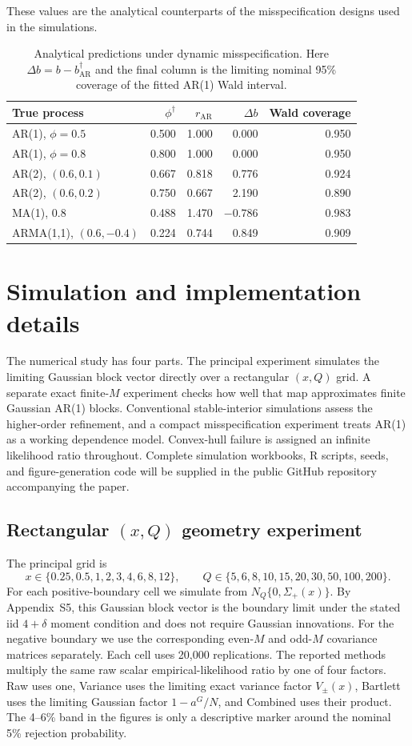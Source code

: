 \documentclass[12pt]{article}
\theoremstyle{remark}
\begin{document}
These values are the analytical counterparts of the misspecification designs used in the simulations.
\begin{table}[htbp]
\centering
\small
\caption{Analytical predictions under dynamic misspecification. Here $\Delta b=b-b_{\mathrm{AR}}^\dagger$ and the final column is the limiting nominal 95\% coverage of the fitted AR(1) Wald interval.}
\label{tab:supp-misspec-theory}
\begin{tabular}{lrrrr}
\toprule
True process & $\phi^\dagger$ & $r_{\mathrm{AR}}$ & $\Delta b$ & Wald coverage \\
\midrule
AR(1), $\phi=0.5$ & 0.500 & 1.000 & 0.000 & 0.950 \\
AR(1), $\phi=0.8$ & 0.800 & 1.000 & 0.000 & 0.950 \\
AR(2), $(0.6,0.1)$ & 0.667 & 0.818 & 0.776 & 0.924 \\
AR(2), $(0.6,0.2)$ & 0.750 & 0.667 & 2.190 & 0.890 \\
MA(1), $0.8$ & 0.488 & 1.470 & $-0.786$ & 0.983 \\
ARMA(1,1), $(0.6,-0.4)$ & 0.224 & 0.744 & 0.849 & 0.909 \\
\bottomrule
\end{tabular}
\end{table}

\section{Simulation and implementation details}
\label{supp:simulation}
The numerical study has four parts. The principal experiment simulates the limiting Gaussian block vector directly over a rectangular $(x,Q)$ grid. A separate exact finite-$M$ experiment checks how well that map approximates finite Gaussian AR(1) blocks. Conventional stable-interior simulations assess the higher-order refinement, and a compact misspecification experiment treats AR(1) as a working dependence model. Convex-hull failure is assigned an infinite likelihood ratio throughout. Complete simulation workbooks, R scripts, seeds, and figure-generation code will be supplied in the public GitHub repository accompanying the paper.

\subsection{Rectangular $(x,Q)$ geometry experiment}
The principal grid is
\[
x\in\{0.25,0.5,1,2,3,4,6,8,12\},
\qquad
Q\in\{5,6,8,10,15,20,30,50,100,200\}.
\]
For each positive-boundary cell we simulate from $N_Q\{0,\Sigma_+(x)\}$. By Appendix~S5, this Gaussian block vector is the boundary limit under the stated iid $4+\delta$ moment condition and does not require Gaussian innovations. For the negative boundary we use the corresponding even-$M$ and odd-$M$ covariance matrices separately. Each cell uses 20,000 replications. The reported methods multiply the same raw scalar empirical-likelihood ratio by one of four factors. Raw uses one, Variance uses the limiting exact variance factor $V_\pm(x)$, Bartlett uses the limiting Gaussian factor $1-a^G/N$, and Combined uses their product. The 4--6\% band in the figures is only a descriptive marker around the nominal 5\% rejection probability.
\end{document}
